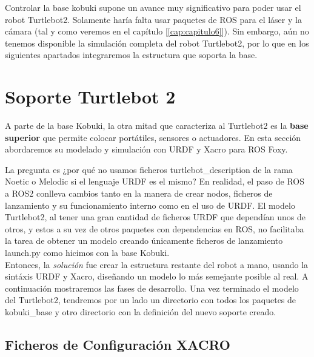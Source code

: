 Controlar la base kobuki supone un avance muy significativo para poder usar el robot Turtlebot2. Solamente haría falta usar paquetes de ROS para el láser y la cámara (tal y como veremos en el capítulo [\ref{cap:capitulo6}]). Sin embargo, aún no tenemos disponible la simulación completa del robot Turtlebot2, por lo que en los siguientes apartados integraremos la estructura que soporta la base.\\




\section{Soporte Turtlebot 2}
\label{sec:soporte_turtlebot2}

A parte de la base Kobuki, la otra mitad que caracteriza al Turtlebot2 es la \textbf{base superior} que permite colocar portátiles, sensores o actuadores. En esta sección abordaremos su modelado y simulación con URDF y Xacro para ROS Foxy.

La pregunta es ¿por qué no usamos ficheros turtlebot\_description de la rama Noetic o Melodic si el lenguaje URDF es el mismo? En realidad, el paso de ROS a ROS2 conlleva cambios tanto en la manera de crear nodos, ficheros de lanzamiento y su funcionamiento interno como en el uso de URDF. El modelo Turtlebot2, al tener una gran cantidad de ficheros URDF que dependían unos de otros, y estos a su vez de otros paquetes con dependencias en ROS, no facilitaba la tarea de obtener un modelo creando únicamente ficheros de lanzamiento launch.py como hicimos con la base Kobuki.\\

Entonces, la \textit{solución} fue crear la estructura restante del robot a mano, usando la sintáxis URDF y Xacro, diseñando un modelo lo más semejante posible al real. A continuación mostraremos las fases de desarrollo. Una vez terminado el modelo del Turtlebot2, tendremos por un lado un directorio con todos los paquetes de kobuki\_base y otro directorio con la definición del nuevo soporte creado.\\



\subsection{Ficheros de Configuración XACRO}
\label{subsec:turtlebot2_xacro}

